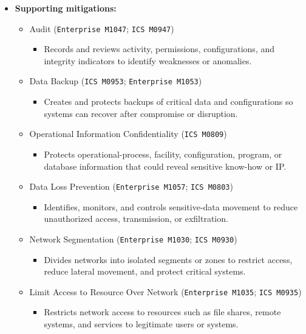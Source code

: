 \documentclass[10pt,a4paper,oneside]{report}
\begin{document}
\begin{itemize}
\item \textbf{Supporting mitigations:}
\begin{itemize}
\item Audit (\texttt{Enterprise M1047}; \texttt{ICS M0947})
\begin{itemize}
\item Records and reviews activity, permissions, configurations, and integrity indicators to identify weaknesses or anomalies.
\end{itemize}
\item Data Backup (\texttt{ICS M0953}; \texttt{Enterprise M1053})
\begin{itemize}
\item Creates and protects backups of critical data and configurations so systems can recover after compromise or disruption.
\end{itemize}
\item Operational Information Confidentiality (\texttt{ICS M0809})
\begin{itemize}
\item Protects operational-process, facility, configuration, program, or database information that could reveal sensitive know-how or IP.
\end{itemize}
\item Data Loss Prevention (\texttt{Enterprise M1057}; \texttt{ICS M0803})
\begin{itemize}
\item Identifies, monitors, and controls sensitive-data movement to reduce unauthorized access, transmission, or exfiltration.
\end{itemize}
\item Network Segmentation (\texttt{Enterprise M1030}; \texttt{ICS M0930})
\begin{itemize}
\item Divides networks into isolated segments or zones to restrict access, reduce lateral movement, and protect critical systems.
\end{itemize}
\item Limit Access to Resource Over Network (\texttt{Enterprise M1035}; \texttt{ICS M0935})
\begin{itemize}
\item Restricts network access to resources such as file shares, remote systems, and services to legitimate users or systems.
\end{itemize}
\end{itemize}
\end{itemize}
\end{document}
